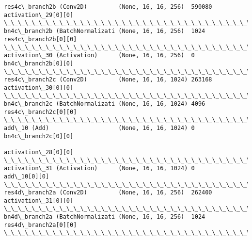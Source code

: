 \documentclass[11pt]{article}
\begin{document}
\begin{Verbatim}[commandchars=\\\{\}]
res4c\_branch2b (Conv2D)         (None, 16, 16, 256)  590080      activation\_29[0][0]              
\_\_\_\_\_\_\_\_\_\_\_\_\_\_\_\_\_\_\_\_\_\_\_\_\_\_\_\_\_\_\_\_\_\_\_\_\_\_\_\_\_\_\_\_\_\_\_\_\_\_\_\_\_\_\_\_\_\_\_\_\_\_\_\_\_\_\_\_\_\_\_\_\_\_\_\_\_\_\_\_\_\_\_\_\_\_\_\_\_\_\_\_\_\_\_\_\_\_
bn4c\_branch2b (BatchNormalizati (None, 16, 16, 256)  1024        res4c\_branch2b[0][0]             
\_\_\_\_\_\_\_\_\_\_\_\_\_\_\_\_\_\_\_\_\_\_\_\_\_\_\_\_\_\_\_\_\_\_\_\_\_\_\_\_\_\_\_\_\_\_\_\_\_\_\_\_\_\_\_\_\_\_\_\_\_\_\_\_\_\_\_\_\_\_\_\_\_\_\_\_\_\_\_\_\_\_\_\_\_\_\_\_\_\_\_\_\_\_\_\_\_\_
activation\_30 (Activation)      (None, 16, 16, 256)  0           bn4c\_branch2b[0][0]              
\_\_\_\_\_\_\_\_\_\_\_\_\_\_\_\_\_\_\_\_\_\_\_\_\_\_\_\_\_\_\_\_\_\_\_\_\_\_\_\_\_\_\_\_\_\_\_\_\_\_\_\_\_\_\_\_\_\_\_\_\_\_\_\_\_\_\_\_\_\_\_\_\_\_\_\_\_\_\_\_\_\_\_\_\_\_\_\_\_\_\_\_\_\_\_\_\_\_
res4c\_branch2c (Conv2D)         (None, 16, 16, 1024) 263168      activation\_30[0][0]              
\_\_\_\_\_\_\_\_\_\_\_\_\_\_\_\_\_\_\_\_\_\_\_\_\_\_\_\_\_\_\_\_\_\_\_\_\_\_\_\_\_\_\_\_\_\_\_\_\_\_\_\_\_\_\_\_\_\_\_\_\_\_\_\_\_\_\_\_\_\_\_\_\_\_\_\_\_\_\_\_\_\_\_\_\_\_\_\_\_\_\_\_\_\_\_\_\_\_
bn4c\_branch2c (BatchNormalizati (None, 16, 16, 1024) 4096        res4c\_branch2c[0][0]             
\_\_\_\_\_\_\_\_\_\_\_\_\_\_\_\_\_\_\_\_\_\_\_\_\_\_\_\_\_\_\_\_\_\_\_\_\_\_\_\_\_\_\_\_\_\_\_\_\_\_\_\_\_\_\_\_\_\_\_\_\_\_\_\_\_\_\_\_\_\_\_\_\_\_\_\_\_\_\_\_\_\_\_\_\_\_\_\_\_\_\_\_\_\_\_\_\_\_
add\_10 (Add)                    (None, 16, 16, 1024) 0           bn4c\_branch2c[0][0]              
                                                                 activation\_28[0][0]              
\_\_\_\_\_\_\_\_\_\_\_\_\_\_\_\_\_\_\_\_\_\_\_\_\_\_\_\_\_\_\_\_\_\_\_\_\_\_\_\_\_\_\_\_\_\_\_\_\_\_\_\_\_\_\_\_\_\_\_\_\_\_\_\_\_\_\_\_\_\_\_\_\_\_\_\_\_\_\_\_\_\_\_\_\_\_\_\_\_\_\_\_\_\_\_\_\_\_
activation\_31 (Activation)      (None, 16, 16, 1024) 0           add\_10[0][0]                     
\_\_\_\_\_\_\_\_\_\_\_\_\_\_\_\_\_\_\_\_\_\_\_\_\_\_\_\_\_\_\_\_\_\_\_\_\_\_\_\_\_\_\_\_\_\_\_\_\_\_\_\_\_\_\_\_\_\_\_\_\_\_\_\_\_\_\_\_\_\_\_\_\_\_\_\_\_\_\_\_\_\_\_\_\_\_\_\_\_\_\_\_\_\_\_\_\_\_
res4d\_branch2a (Conv2D)         (None, 16, 16, 256)  262400      activation\_31[0][0]              
\_\_\_\_\_\_\_\_\_\_\_\_\_\_\_\_\_\_\_\_\_\_\_\_\_\_\_\_\_\_\_\_\_\_\_\_\_\_\_\_\_\_\_\_\_\_\_\_\_\_\_\_\_\_\_\_\_\_\_\_\_\_\_\_\_\_\_\_\_\_\_\_\_\_\_\_\_\_\_\_\_\_\_\_\_\_\_\_\_\_\_\_\_\_\_\_\_\_
bn4d\_branch2a (BatchNormalizati (None, 16, 16, 256)  1024        res4d\_branch2a[0][0]             
\_\_\_\_\_\_\_\_\_\_\_\_\_\_\_\_\_\_\_\_\_\_\_\_\_\_\_\_\_\_\_\_\_\_\_\_\_\_\_\_\_\_\_\_\_\_\_\_\_\_\_\_\_\_\_\_\_\_\_\_\_\_\_\_\_\_\_\_\_\_\_\_\_\_\_\_\_\_\_\_\_\_\_\_\_\_\_\_\_\_\_\_\_\_\_\_\_\_

\end{Verbatim}
\end{document}
